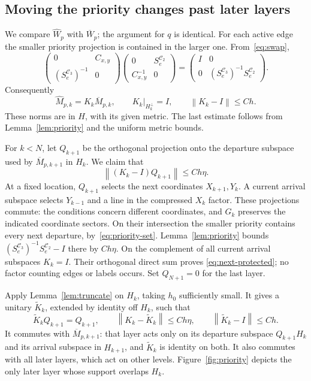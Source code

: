 \documentclass[11pt]{article}
\numberwithin{equation}{section}
\theoremstyle{definition}
\theoremstyle{remark}
\newcommand{\norm}[1]{\left\lVert#1\right\rVert}
\newcommand{\cC}{\mathcal C}
\begin{document}
\subsection{Moving the priority changes past later layers}
We compare $\widehat W_p$ with $\overline W_p$; the argument for $q$ is
identical. For each active edge the smaller priority projection is
contained in the larger one. From~\eqref{eq:swap},
\[
 \begin{pmatrix}0&C_{x,y}\\(S_e^{\cC_3})^{-1}&0\end{pmatrix}
 \begin{pmatrix}0&S_e^{\cC_2}\\C_{x,y}^{-1}&0\end{pmatrix}
 =\begin{pmatrix}I&0\\0&(S_e^{\cC_3})^{-1}S_e^{\cC_2}\end{pmatrix}.
\]
Consequently
\begin{equation}\label{eq:post-unitary}
 \widehat M_{p,k}=K_k\overline M_{p,k},
 \qquad K_k|_{H_k^\perp}=I,\qquad \norm{K_k-I}\le Ch.
\end{equation}
These norms are in $H$, with its given metric. The last estimate follows
from Lemma~\ref{lem:priority} and the uniform metric bounds.

For $k<N$, let $Q_{k+1}$ be the orthogonal projection onto the departure
subspace used by $\overline M_{p,k+1}$ in $H_k$. We claim that
\begin{equation}\label{eq:next-protected}
 \norm{(K_k-I)Q_{k+1}}\le Ch\eta.
\end{equation}
At a fixed location, $Q_{k+1}$ selects the next coordinates $X_{k+1},Y_k$.
A current arrival subspace selects $Y_{k-1}$ and a line in the compressed
$X_k$ factor. These projections commute: the conditions concern different
coordinates, and $G_k$ preserves the indicated coordinate sectors.
On their intersection the smaller priority contains every next departure,
by~\eqref{eq:priority-set}. Lemma~\ref{lem:priority} bounds
$(S_e^{\cC_3})^{-1}S_e^{\cC_2}-I$ there by $Ch\eta$. On the complement
of all current arrival subspaces $K_k=I$. Their orthogonal direct sum proves
\eqref{eq:next-protected}; no factor counting edges or labels occurs.
Set $Q_{N+1}=0$ for the last layer.

Apply Lemma~\ref{lem:truncate} on $H_k$, taking $h_0$ sufficiently small.
It gives a unitary $\widetilde K_k$, extended by identity off $H_k$, such
that
\begin{equation}\label{eq:corrected-unitary}
 \widetilde K_kQ_{k+1}=Q_{k+1},\qquad
 \norm{K_k-\widetilde K_k}\le Ch\eta,\qquad
 \norm{\widetilde K_k-I}\le Ch.
\end{equation}
It commutes with $\overline M_{p,k+1}$: that layer acts only on its
departure subspace $Q_{k+1}H_k$ and its arrival subspace in $H_{k+1}$,
and $\widetilde K_k$ is identity on both. It also commutes with all later
layers, which act on other levels. Figure~\ref{fig:priority} depicts the
only later layer whose support overlaps $H_k$.
\end{document}
